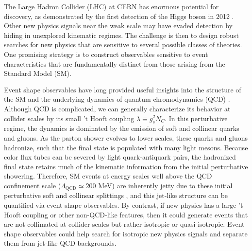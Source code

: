 \documentclass[letterpaper,11pt]{article}
\begin{document}
The Large Hadron Collider (LHC) at CERN has enormous potential for discovery, as demonstrated by the first detection of the Higgs boson in 2012 \cite{Aad:2012tfa,Chatrchyan:2012xdj}.
%
Other new physics signals near the weak scale may have evaded detection by hiding in unexplored kinematic regimes. 
%
The challenge is then to design robust searches for new physics that are sensitive to several possible classes of theories. 
%
One promising strategy is to construct observables sensitive to event characteristics that are fundamentally distinct from those arising from the Standard Model (SM).


Event shape observables have long provided useful insights into the structure of the SM and the underlying dynamics of quantum chromodynamics (QCD) \cite{Farhi:1977sg, Barber:1979bj,Althoff:1983ew,Abrams:1989ez,Li:1989sn,Buskulic:1995aw,Adriani:1992gs, Braunschweig:1990yd,Abe:1994mf,Heister:2003aj,Abdallah:2003xz,Achard:2004sv, Abbiendi:2004qz, Dasgupta:2003iq,Dissertori:2008cn}.
%
Although QCD is complicated, we can generally characterize its behavior at collider scales by its small 't Hooft coupling $\lambda \equiv g_s^2 N_C$. 
%
In this perturbative regime, the dynamics is dominated by the emission of soft and collinear quarks and gluons.
%
As the parton shower evolves to lower scales, these quarks and gluons hadronize, such that the final state is populated with many light mesons.
%
Because color flux tubes can be severed by light quark-antiquark pairs, the hadronized final state retains much of the kinematic information from the initial perturbative showering.
%
Therefore, SM events at energy scales well above the QCD confinement scale ($\Lambda_\text{QCD} \simeq 200$ MeV) are inherently jetty due to these initial perturbative soft and collinear splittings \cite{Ellis:1991qj}, and this jet-like structure can be quantified via event shape observables. 
%
By contrast, if new physics has a large 't Hooft coupling or other non-QCD-like features, then it could generate events that are not collimated at collider scales but rather isotropic or quasi-isotropic.
%
Event shape observables could help search for isotropic new physics signals and separate them from jet-like QCD backgrounds.
\end{document}

